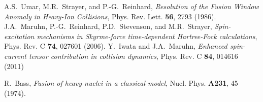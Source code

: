 \documentclass{PoS}
\begin{document}
\begin{thebibliography}{99}
A.S.~Umar, M.R.~Strayer, and P.-G.~Reinhard,
\emph{Resolution of the Fusion Window Anomaly in Heavy-Ion Collisions},
Phys. Rev. Lett. \textbf{56}, 2793 (1986).
J.A.~Maruhn, P.-G.~Reinhard, P.D.~Stevenson, and M.R.~Strayer,
\emph{Spin-excitation mechanisms in Skyrme-force time-dependent Hartree-Fock calculations},
Phys. Rev. C \textbf{74}, 027601 (2006).
Y.~Iwata and J.A.~Maruhn,
\emph{Enhanced spin-current tensor contribution in collision dynamics},
Phys. Rev. C \textbf{84}, 014616 (2011)

R.~Bass, \emph{Fusion of heavy nuclei in a classical model},
Nucl. Phys. \textbf{A231}, 45 (1974).

\end{thebibliography}
\end{document}
